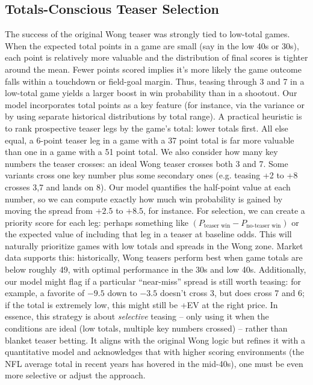 \documentclass[11pt]{amsart}
\begin{document}
\subsection{Totals-Conscious Teaser Selection}
The success of the original Wong teaser was strongly tied to low-total games. When the expected total points in a game are small (say in the low 40s or 30s), each point is relatively more valuable and the distribution of final scores is tighter around the mean. Fewer points scored implies it’s more likely the game outcome falls within a touchdown or field-goal margin. Thus, teasing through 3 and 7 in a low-total game yields a larger boost in win probability than in a shootout. Our model incorporates total points as a key feature (for instance, via the variance or by using separate historical distributions by total range). A practical heuristic is to rank prospective teaser legs by the game’s total: lower totals first. All else equal, a 6-point teaser leg in a game with a 37 point total is far more valuable than one in a game with a 51 point total. We also consider how many key numbers the teaser crosses: an ideal Wong teaser crosses both 3 and 7. Some variants cross one key number plus some secondary ones (e.g. teasing +2 to +8 crosses 3,7 and lands on 8). Our model quantifies the half-point value at each number, so we can compute exactly how much win probability is gained by moving the spread from $+2.5$ to $+8.5$, for instance. For selection, we can create a priority score for each leg: perhaps something like $(P_{\text{teaser win}} - P_{\text{no-teaser win}})$ or the expected value of including that leg in a teaser at baseline odds. This will naturally prioritize games with low totals and spreads in the Wong zone. Market data supports this: historically, Wong teasers perform best when game totals are below roughly 49, with optimal performance in the 30s and low 40s. Additionally, our model might flag if a particular “near-miss” spread is still worth teasing: for example, a favorite of \(-9.5\) down to \(-3.5\) doesn’t cross 3, but does cross 7 and 6; if the total is extremely low, this might still be +EV at the right price. In essence, this strategy is about \emph{selective} teasing – only using it when the conditions are ideal (low totals, multiple key numbers crossed) – rather than blanket teaser betting. It aligns with the original Wong logic but refines it with a quantitative model and acknowledges that with higher scoring environments (the NFL average total in recent years has hovered in the mid-40s), one must be even more selective or adjust the approach.
\end{document}
